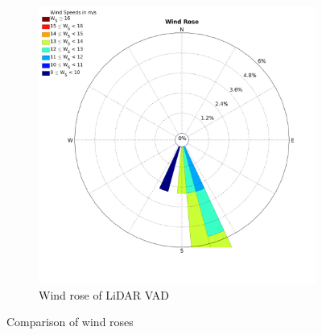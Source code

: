 \documentclass[10pt]{article}
\begin{document}
\begin{figure}[htb!]
\begin{subfigure}{0.5\textwidth}
  \includegraphics[width=1\linewidth]{../Exercises_and_Tasks/ex2/figures/WindRose_lidar.png}
  \caption{Wind rose of LiDAR VAD}
\end{subfigure}
\caption{Comparison of wind roses}
  \label{fig:WindrosesVal}
\end{figure}
\end{document}
